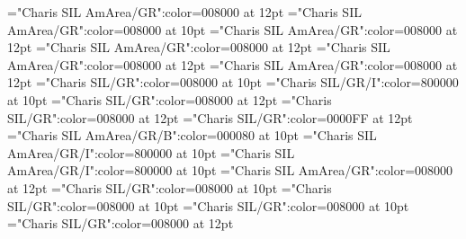 \documentclass[a4paper,twoside]{article}
\begin{document}
\font\visiblevariantentryrefsminorentryvariantletDatadicBody="Charis SIL AmArea/GR":color=008000 at 12pt
\font\spanvisiblevariantentryrefsminorentryvariantletDatadicBody="Charis SIL AmArea/GR":color=008000 at 10pt
\font\visiblevariantentryrefvisiblevariantentryrefsminorentryvariantletDatadicBody="Charis SIL AmArea/GR":color=008000 at 12pt
\font\variantentrytypesvisiblevariantentryrefvisiblevariantentryrefsminorentryvariantletDatadicBody="Charis SIL AmArea/GR":color=008000 at 12pt
\font\variantentrytypevariantentrytypesvisiblevariantentryrefvisiblevariantentryrefsminorentryvariantletDatadicBody="Charis SIL AmArea/GR":color=008000 at 12pt
\font\reverseabbrvariantentrytypevariantentrytypesvisiblevariantentryrefvisiblevariantentryrefsminorentryvariantletDatadicBody="Charis SIL AmArea/GR":color=008000 at 12pt
\font\spanesreverseabbrvariantentrytypevariantentrytypesvisiblevariantentryrefvisiblevariantentryrefsminorentryvariantletDatadicBody="Charis SIL/GR":color=008000 at 10pt
\font\spanreverseabbrvariantentrytypevariantentrytypesvisiblevariantentryrefvisiblevariantentryrefsminorentryvariantletDatadicBody="Charis SIL/GR/I":color=800000 at 10pt
\font{}="Charis SIL/GR":color=008000 at 12pt
\font{}="Charis SIL/GR":color=008000 at 12pt
\font\headwordreferencedentryreferencedentriesvisiblevariantentryrefvisiblevariantentryrefsminorentryvariantletDatadicBody="Charis SIL/GR":color=0000FF at 12pt
\font\spanmxbheadwordreferencedentryreferencedentriesvisiblevariantentryrefvisiblevariantentryrefsminorentryvariantletDatadicBody="Charis SIL AmArea/GR/B":color=000080 at 10pt
\font\spanspanmxbheadwordreferencedentryreferencedentriesvisiblevariantentryrefvisiblevariantentryrefsminorentryvariantletDatadicBody="Charis SIL AmArea/GR/I":color=800000 at 10pt
\font\spanheadwordreferencedentryreferencedentriesvisiblevariantentryrefvisiblevariantentryrefsminorentryvariantletDatadicBody="Charis SIL AmArea/GR/I":color=800000 at 10pt
\font\summarydefinitionminorentryvariantletDatadicBody="Charis SIL AmArea/GR":color=008000 at 12pt
\font\spanessummarydefinitionminorentryvariantletDatadicBody="Charis SIL/GR":color=008000 at 10pt
\font\spanspanessummarydefinitionminorentryvariantletDatadicBody="Charis SIL/GR":color=008000 at 10pt
\font\spansummarydefinitionminorentryvariantletDatadicBody="Charis SIL/GR":color=008000 at 10pt
\font\morphosyntaxanalysissensesensecontentsensesentryletDatadicBody="Charis SIL/GR":color=008000 at 12pt
\end{document}
